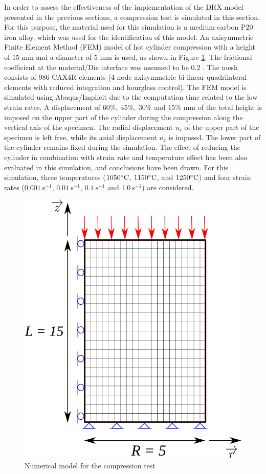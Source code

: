 \documentclass[metals,article,submit,pdftex,moreauthors]{Definitions/mdpi}
\DeclareRobustCommand{\ps}{\text{s}^{-1}}
\begin{document}
In order to assess the effectiveness of the implementation of the DRX model presented in the previous sections, a compression test is simulated in this section.
For this purpose, the material used for this simulation is a medium-carbon P20 iron alloy, which was used for the identification of this model.
An axisymmetric Finite Element Method (FEM) model of hot cylinder compression with a height of $15$ mm and a diameter of $5$ mm is used, as shown in Figure \ref{fig:Mesh}.
The frictional coefficient at the material/Die interface was assumed to be $0.2$ \cite{zhang2019elevated,sun2020kinetique}.
The mesh consists of 986 CAX4R elements (4-node axisymmetric bi-linear quadrilateral elements with reduced integration and hourglass control).
The FEM model is simulated using Abaqus/Implicit due to the computation time related to the low strain rates.
A displacement of $60\%, ~45\%, ~30\%$ and $15\%$ mm of the total height is imposed on the upper part of the cylinder during the compression along the vertical axis of the specimen.
The radial displacement $u_r$ of the upper part of the specimen is left free, while its axial displacement $u_z$ is imposed.
The lower part of the cylinder remains fixed during the simulation.
The effect of reducing the cylinder in combination with strain rate and temperature effect has been also evaluated in this simulation, and conclusions have been drawn.
For this simulation, three temperatures ($1050\celsius$, $1150\celsius$, and $1250\celsius$) and four strain rates ($0.001~\ps$, $0.01~\ps$, $0.1~\ps$ and $1.0~\ps$) are considered.
\begin{figure}[H]
\centering
\includegraphics[width=0.6\columnwidth]{Figures/CyCompression2}
\caption{Numerical model for the compression test}
\label{fig:Mesh}
\end{figure}
\end{document}
